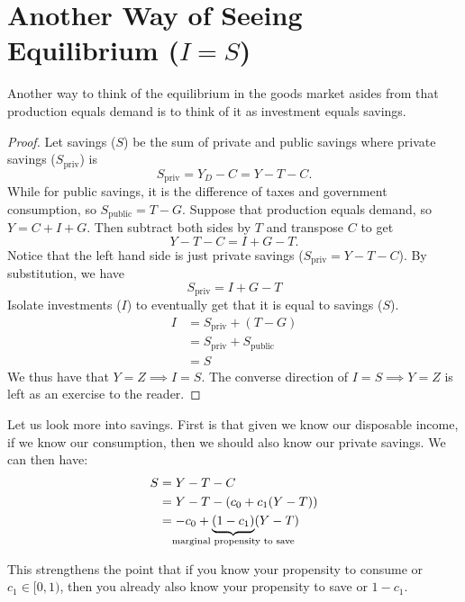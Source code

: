\documentclass{extarticle}
\begin{document}
\section{Another Way of Seeing Equilibrium ($I = S$)}
Another way to think of the equilibrium in the goods market asides from that production equals demand is to think of it as investment equals savings.
\begin{proof}
  Let savings ($S$) be the sum of private and public savings where private savings ($S_{\text{priv}}$) is
  $$S_{\text{priv}} = Y_D - C = Y - T - C.$$
  While for public savings, it is the difference of taxes and government consumption, so $S_{\text{public}} = T - G$. Suppose that production equals demand, so $Y = C + I + G$. Then subtract both sides by $T$ and transpose $C$ to get
  $$ Y - T - C = I + G - T.$$
  Notice that the left hand side is just private savings ($S_{\text{priv}} = Y - T - C$). By substitution, we have
  $$S_{\text{priv}} = I + G - T$$
  Isolate investments ($I$) to eventually get that it is equal to savings ($S$).
  \begin{align*}
    I &= S_{\text{priv}} + (T - G) \\
    &= S_{\text{priv}} + S_{\text{public}} \\
    &= S
  \end{align*}
  We thus have that $Y = Z \implies I = S$. The converse direction of $I = S \implies Y = Z$ is left as an exercise to the reader.
\end{proof}

Let us look more into savings. First is that given we know our disposable income, if we know our consumption, then we should also know our private savings. We can then have:
\begin{align*}
  S &= Y - T - C \\
    &= Y - T - (c_0 + c_1(Y-T)) \\
    &= -c_0 + \underbrace{(1-c_1)}_{\mathclap{\text{marginal propensity to save}}}(Y-T)
\end{align*}

This strengthens the point that if you know your propensity to consume or $c_1 \in [0, 1)$, then you already also know your propensity to save or $1-c_1$.
\end{document}

